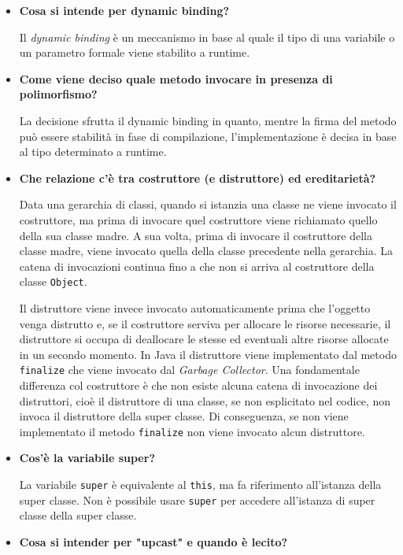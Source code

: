 \documentclass[12pt, a4paper]{article}
\begin{document}
\begin{itemize}
    \item \textbf{Cosa si intende per dynamic binding?}
    
    Il \emph{dynamic binding} è un meccanismo in base al quale il tipo di una
    variabile o un parametro formale viene stabilito a runtime.

    \item \textbf{Come viene deciso quale metodo invocare in presenza di polimorfismo?}
    
    La decisione sfrutta il dynamic binding in quanto, mentre la firma del metodo
    può essere stabilità in fase di compilazione, l'implementazione è decisa in
    base al tipo determinato a runtime.

    \item \textbf{Che relazione c'è tra costruttore (e distruttore) ed ereditarietà?}
    
    Data una gerarchia di classi, quando si istanzia una classe ne viene invocato
    il costruttore, ma prima di invocare quel costruttore viene richiamato quello della
    sua classe madre. A sua volta, prima di invocare il costruttore della classe madre,
    viene invocato quella della classe precedente nella gerarchia. La catena di invocazioni
    continua fino a che non si arriva al costruttore della classe \texttt{Object}.

    Il distruttore viene invece invocato automaticamente prima che l'oggetto venga
    distrutto e, se il costruttore serviva per allocare le risorse necessarie, il
    distruttore si occupa di deallocare le stesse ed eventuali altre risorse
    allocate in un secondo momento. In Java il distruttore viene implementato dal
    metodo \texttt{finalize} che viene invocato dal \emph{Garbage Collector}.
    Una fondamentale differenza col costruttore è che non esiste alcuna catena di
    invocazione dei distruttori, cioè il distruttore di una classe, se non esplicitato
    nel codice, non invoca il distruttore della super classe. Di conseguenza, se non
    viene implementato il metodo \texttt{finalize} non viene invocato alcun distruttore.

    \item \textbf{Cos'è la variabile super?}
    
    La variabile \texttt{super} è equivalente al \texttt{this}, ma fa riferimento
    all'istanza della super classe. Non è possibile usare \texttt{super} per
    accedere all'istanza di super classe della super classe.

    \item \textbf{Cosa si intender per "upcast" e quando è lecito?}
    

\end{itemize}
\end{document}
